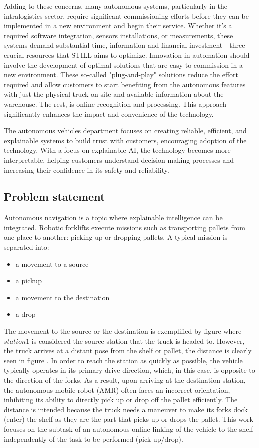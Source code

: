 Adding to these concerns, many autonomous systems, particularly in the intralogistics 
sector, require significant commissioning efforts before they can be implemented in 
a new environment and begin their service. Whether it's a required software integration, 
sensors installations, or 
measurements, these systems demand substantial time, information and financial investment—three 
crucial resources that STILL aims to optimize. Innovation in automation should involve 
the development of optimal solutions that are easy to 
commission in a new environment. These so-called "plug-and-play" solutions reduce 
the effort required and allow customers to start benefiting from the autonomous 
features with just the physical truck on-site and available information about the 
warehouse. The rest, is online recognition and processing. This approach 
significantly enhances the impact and convenience of the technology. 

The autonomous vehicles department focuses on creating reliable, efficient, and 
explainable systems to build trust with customers, encouraging adoption of the technology. 
With a focus on explainable AI, the technology becomes more interpretable, helping customers 
understand decision-making processes and increasing their confidence in its safety and reliability.

\subsection{Problem statement}

Autonomous navigation is a topic where explainable intelligence can be integrated. 
Robotic forklifts execute missions such as transporting pallets from one place to another: 
picking up or dropping pallets.
A typical mission is separated into:
\begin{itemize}
    \item a movement to a source
    \item a pickup
    \item a movement to the destination
    \item a drop
\end{itemize}

The movement to the source or the destination is exemplified by figure  where 
\(station1\) is considered the source station that the truck is headed to.
However, the truck arrives at a distant pose from the shelf or pallet,
the distance is clearly seen in figure . In order to reach the station as quickly as possible, the 
vehicle typically operates in its primary drive direction, which, in this case, is opposite to the direction 
of the forks. As a result, upon arriving at the destination station, the autonomous mobile robot (AMR) often 
faces an incorrect orientation, inhibiting its ability to directly pick up or drop off the pallet efficiently.
The distance is intended because the truck needs a maneuver to make its forks dock (enter) the shelf
as they are the part that picks up or drops the pallet.
This work focuses on the subtask of an autonomous online linking of the vehicle to the shelf
independently of the task to be performed (pick up/drop). 

